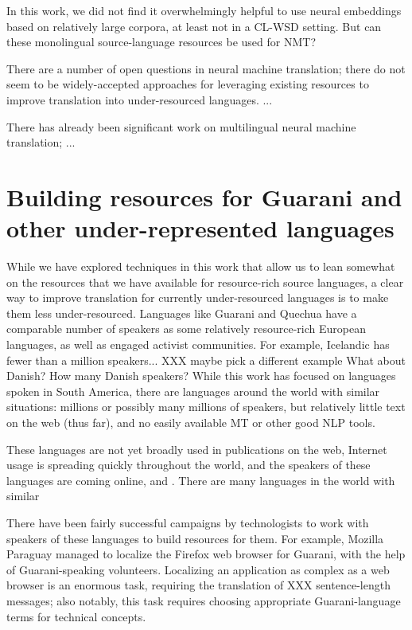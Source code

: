 In this work, we did not find it overwhelmingly helpful to use neural
embeddings based on relatively large corpora, at least not in a CL-WSD setting.
But can these monolingual source-language resources be used for NMT?

There are a number of open questions in neural machine translation; there do
not seem to be widely-accepted approaches for leveraging existing resources to
improve translation into under-resourced languages. ... %

There has already been significant work on multilingual neural machine
translation; ...



\section{Building resources for Guarani and other under-represented languages}
\label{sec:crowdsourcing}

While we have explored techniques in this work that allow us to lean
somewhat on the resources that we have available for resource-rich source
languages, a clear way to improve translation for currently under-resourced
languages is to make them less under-resourced. Languages like Guarani and
Quechua have a comparable number of speakers as some relatively resource-rich
European languages, as well as engaged activist communities. For example,
Icelandic has fewer than a million speakers... XXX maybe pick a different
example
What about Danish? How many Danish speakers?
While this work has focused on languages spoken in South America, there are
languages around the world with similar situations: millions or possibly many
millions of speakers, but relatively little text on the web (thus far), and no
easily available MT or other good NLP tools.

These languages are not yet broadly used in publications on the web,
Internet usage is spreading quickly throughout the world, and
the speakers of these languages are coming online, and . There are many languages in
the world with similar 

There have been fairly successful campaigns by technologists to work with
speakers of these languages to build resources for them.
For example, Mozilla Paraguay managed to localize the Firefox web browser for
Guarani, with the help of Guarani-speaking volunteers. Localizing an
application as complex as a web browser is an enormous task, requiring the
translation of XXX sentence-length messages; also notably, this task requires
choosing appropriate Guarani-language terms for technical concepts.

